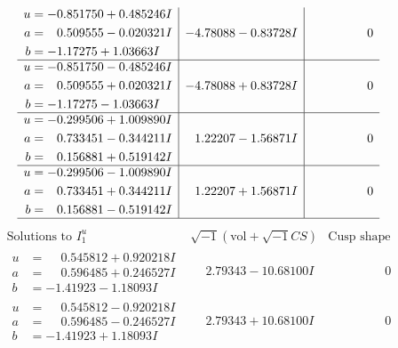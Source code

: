 \documentclass[1p]{elsarticle_modified}
\theoremstyle{definition}
\newcommand{\I}{\sqrt{-1}}
\begin{document}
$$\begin{array}{c|c|c}
\begin{aligned}
u &= -0.851750 + 0.485246 I \\
a &= \phantom{-}0.509555 - 0.020321 I \\
b &= -1.17275 + 1.03663 I\end{aligned}
 & -4.78088 - 0.83728 I & \phantom{-0.000000 } 0 \\ \hline\begin{aligned}
u &= -0.851750 - 0.485246 I \\
a &= \phantom{-}0.509555 + 0.020321 I \\
b &= -1.17275 - 1.03663 I\end{aligned}
 & -4.78088 + 0.83728 I & \phantom{-0.000000 } 0 \\ \hline\begin{aligned}
u &= -0.299506 + 1.009890 I \\
a &= \phantom{-}0.733451 - 0.344211 I \\
b &= \phantom{-}0.156881 + 0.519142 I\end{aligned}
 & \phantom{-}1.22207 - 1.56871 I & \phantom{-0.000000 } 0 \\ \hline\begin{aligned}
u &= -0.299506 - 1.009890 I \\
a &= \phantom{-}0.733451 + 0.344211 I \\
b &= \phantom{-}0.156881 - 0.519142 I\end{aligned}
 & \phantom{-}1.22207 + 1.56871 I & \phantom{-0.000000 } 0\\
 \hline 
 \end{array}$$\newpage$$\begin{array}{c|c|c}  
\text{Solutions to }I^u_{1}& \I (\text{vol} + \sqrt{-1}CS) & \text{Cusp shape}\\
 \hline 
\begin{aligned}
u &= \phantom{-}0.545812 + 0.920218 I \\
a &= \phantom{-}0.596485 + 0.246527 I \\
b &= -1.41923 - 1.18093 I\end{aligned}
 & \phantom{-}2.79343 - 10.68100 I & \phantom{-0.000000 } 0 \\ \hline\begin{aligned}
u &= \phantom{-}0.545812 - 0.920218 I \\
a &= \phantom{-}0.596485 - 0.246527 I \\
b &= -1.41923 + 1.18093 I\end{aligned}
 & \phantom{-}2.79343 + 10.68100 I & \phantom{-0.000000 } 0 \\ \hline\begin{aligned}

\end{aligned}
\end{array}$$
\end{document}

